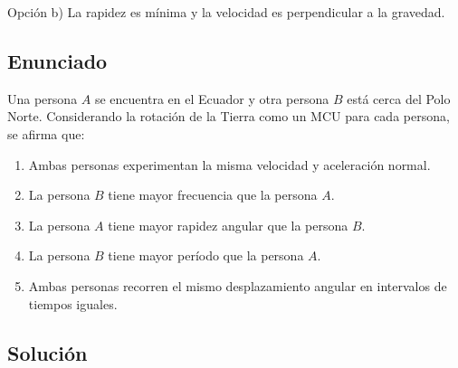 \documentclass[12pt, a4paper]{article}
\begin{document}
\begin{tcolorbox}[colback=green!5!white, colframe=green!50!black, title=Respuesta Final]
\centering Opción b) La rapidez es mínima y la velocidad es perpendicular a la gravedad.
\end{tcolorbox}

\newpage

\subsection*{Enunciado}
Una persona $A$ se encuentra en el Ecuador y otra persona $B$ está cerca del Polo Norte. Considerando la rotación de la Tierra como un MCU para cada persona, se afirma que:
\begin{enumerate}[label=\alph*)]
    \item Ambas personas experimentan la misma velocidad y aceleración normal.
    \item La persona $B$ tiene mayor frecuencia que la persona $A$.
    \item La persona $A$ tiene mayor rapidez angular que la persona $B$.
    \item La persona $B$ tiene mayor período que la persona $A$.
    \item Ambas personas recorren el mismo desplazamiento angular en intervalos de tiempos iguales.
\end{enumerate}

\begin{center}
\end{center}

\subsection*{Solución}
\end{document}
